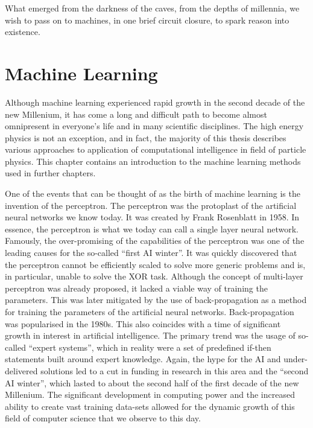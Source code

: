 \begin{savequote}[75mm]
What emerged from the darkness of the caves, from the depths of millennia, we wish to pass on to machines, in one brief circuit closure, to spark reason into existence.
\end{savequote}


\chapter{Machine Learning }
\label{chap:ml}

Although machine learning experienced rapid growth in the second decade of the new Millenium, it has come a long and difficult path to become almost omnipresent in everyone's life and in many scientific disciplines.
The high energy physics is not an exception, and in fact, the majority of this thesis describes various approaches to application of computational intelligence in field of particle physics.
This chapter contains an introduction to the machine learning methods used in further chapters.

One of the events that can be thought of as the birth of machine learning is the invention of the perceptron.
The perceptron was the protoplast of the artificial neural networks we know today. It was created by Frank Rosenblatt \cite{Rosenblatt1958ThePA} in 1958.
In essence, the perceptron is what we today can call a single layer neural network.
Famously, the over-promising of the capabilities of the perceptron was one of the leading causes for the so-called ``first AI winter''\cite{enwiki:1076647189}.
It was quickly discovered that the perceptron cannot be efficiently scaled to solve more generic problems and is, in particular, unable to solve the XOR task.
Although the concept of multi-layer perceptron was already proposed, it lacked a viable way of training the parameters.
This was later mitigated by the use of back-propagation as a method for training the parameters of the artificial neural networks.
Back-propagation was popularised in the 1980s. This also coincides with a time of significant growth in interest in artificial intelligence.
The primary trend was the usage of so-called ``expert systems'', which in reality were a set of predefined if-then statements built around expert knowledge.
Again, the hype for the AI and under-delivered solutions led to a cut in funding in research in this area and the ``second AI winter'', which lasted to about the second half of the first decade of the new Millenium.
The significant development in computing power and the increased ability to create vast training data-sets allowed for the dynamic growth of this field of computer science that we observe to this day.

